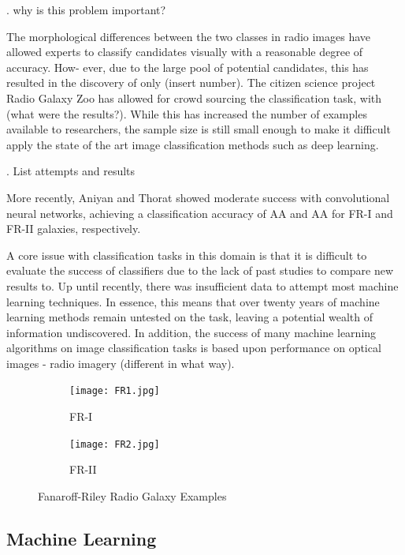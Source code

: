 \documentclass[%
 aip,
 jmp,%
 amsmath,amssymb,
 reprint,%
]{revtex4-1}
\begin{document}
. why is this problem important?

The morphological differences between the two classes
in radio images have allowed experts to classify candidates visually with a reasonable degree of accuracy. How-
ever, due to the large pool of potential candidates, this
has resulted in the discovery of only (insert number). The
citizen science project Radio Galaxy Zoo has allowed for
crowd sourcing the classification task, with (what were
the results?). While this has increased the number of
examples available to researchers, the sample size is still
small enough to make it difficult apply the state of the
art image classification methods such as deep learning.

. List attempts and results

More recently, Aniyan and Thorat showed moderate
success with convolutional neural networks, achieving a
classification accuracy of AA and AA for FR-I and FR-II
galaxies, respectively.

A core issue with classification tasks in this domain is
that it is difficult to evaluate the success of classifiers due to the lack of past studies to compare new results to. Up until recently, there was insufficient data to attempt most machine learning techniques. In essence, this means that over twenty years of machine learning methods remain
untested on the task, leaving a potential wealth of information undiscovered. In addition, the success of many
machine learning algorithms on image classification tasks
is based upon performance on optical images - radio imagery (different in what way).


\begin{figure}
 
    \begin{subfigure}[b]{0.5\textwidth}
        \texttt{[image: FR1.jpg]} 
        \caption{FR-I}
        \label{fig:subim1}
    \end{subfigure}
    \begin{subfigure}[b]{0.5\textwidth}
        \texttt{[image: FR2.jpg]}
        \caption{FR-II}
        \label{fig:subim2}
    \end{subfigure}
 
    \caption{Fanaroff-Riley Radio Galaxy Examples}
    \label{fig:image2}
\end{figure}


\subsection{\label{sec:level2}Machine Learning}
\end{document}
